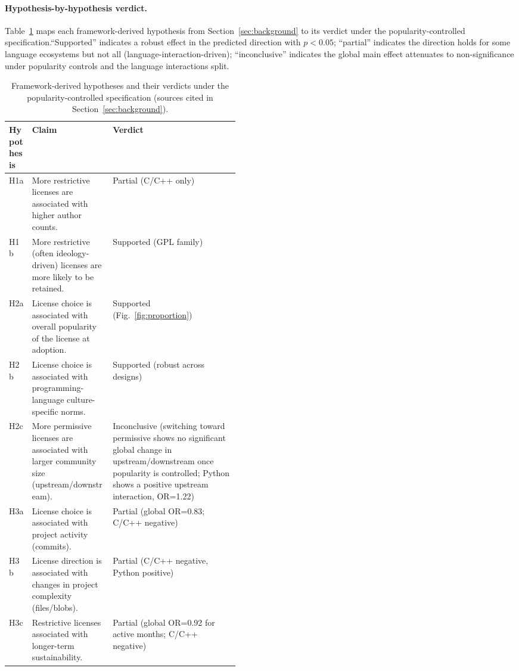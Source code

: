 \paragraph{Hypothesis-by-hypothesis verdict.}
Table~\ref{tbl:hverdict} maps each framework-derived hypothesis from
Section~\ref{sec:background} to its verdict under the popularity-controlled
specification.``Supported'' indicates a robust
effect in the predicted direction with $p<0.05$; ``partial'' indicates
the direction holds for some language ecosystems but not all
(language-interaction-driven); ``inconclusive'' indicates the global
main effect attenuates to non-significance under popularity controls
and the language interactions split.

\begin{table}[t]
  \centering 
\small
\caption{Framework-derived hypotheses and their verdicts under the
popularity-controlled specification (sources cited in
Section~\ref{sec:background}).}
\label{tbl:hverdict}
\vspace{-.05in}\begin{tabular}{p{0.1\linewidth} p{0.35\linewidth} p{}}
\toprule
\textbf{Hypothesis} & \textbf{Claim} & \textbf{Verdict} \\
\midrule
H1a & More restrictive licenses are associated with higher author counts. & Partial (C/C++ only) \\
H1b & More restrictive (often ideology-driven) licenses are more likely to be retained. & Supported (GPL family) \\
H2a & License choice is associated with overall popularity of the license at adoption. & Supported (Fig.~\ref{fig:proportion}) \\
H2b & License choice is associated with programming-language culture-specific norms. & Supported (robust across designs) \\
H2c & More permissive licenses are associated with larger community size (upstream/downstream). & Inconclusive (switching toward permissive shows no significant global change in upstream/downstream once popularity is controlled; Python shows a positive upstream interaction, OR=1.22) \\
H3a & License choice is associated with project activity (commits). & Partial (global OR=0.83; C/C++ negative) \\
H3b & License direction is associated with changes in project complexity (files/blobs). & Partial (C/C++ negative, Python positive) \\
H3c & Restrictive licenses associated with longer-term sustainability. & Partial (global OR=0.92 for active months; C/C++ negative) \\
\bottomrule
\end{tabular}
\vspace{-.15in}\end{table}

